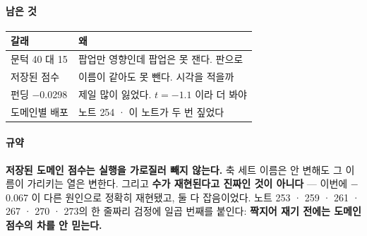\documentclass[10pt]{article}
\begin{document}
\paragraph{남은 것}
\begin{center}\small
\begin{tabular}{ll}
\hline
갈래 & 왜 \\
\hline
문턱 40 대 15 & 팝업만 영향인데 팝업은 못 잰다. 판으로 \\
저장된 점수 & 이름이 같아도 못 뺀다. 시각을 적을까 \\
펀딩 $-$0.0298 & 제일 많이 잃었다. $t{=}{-}1.1$ 이라 더 봐야 \\
도메인별 배포 & 노트 254 · 이 노트가 두 번 짚었다 \\
\hline
\end{tabular}
\end{center}

\paragraph{규약} \textbf{저장된 도메인 점수는 실행을 가로질러 빼지 않는다.}
축 세트 이름은 안 변해도 그 이름이 가리키는 열은 변한다. 그리고 \textbf{수가
재현된다고 진짜인 것이 아니다} --- 이번에 $-$0.067 이 다른 원인으로 정확히
재현됐고, 둘 다 잡음이었다. 노트 253 · 259 · 261 · 267 · 270 · 273의 한
줄짜리 검정에 일곱 번째를 붙인다: \textbf{짝지어 재기 전에는 도메인 점수의
차를 안 믿는다.}
\end{document}
